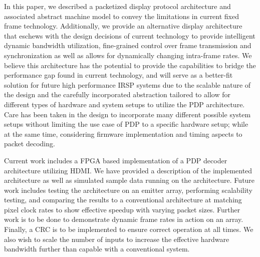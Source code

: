 \label{chap:conclusion}
In this paper, we described a packetized display protocol architecture and associated abstract machine model to convey the limitations in current fixed frame technology. Additionally, we provide an alternative display architecture that eschews with the design decisions of current technology to provide intelligent dynamic bandwidth utilization, fine-grained control over frame transmission and synchronization as well as allows for dynamically changing intra-frame rates. We believe this architecture has the potential to provide the capabilities to bridge the performance gap found in current technology, and will serve as a better-fit solution for future high performance IRSP systems due to the scalable nature of the design and the carefully incorporated abstraction tailored to allow for different types of hardware and system setups to utilize the PDP architecture. Care has been taken in the design to incorporate many different possible system setups without limiting the use case of PDP to a specific hardware setup; while at the same time, considering firmware implementation and timing aspects to packet decoding.

Current work includes a FPGA based implementation of a PDP decoder architecture utilizing HDMI. We have provided a description of the implemented architecture as well as simulated sample data running on the architecture. Future work includes testing the architecture on an emitter array, performing scalability testing, and comparing the results to a conventional architecture at matching pixel clock rates to show effective speedup with varying packet sizes. Further work is to be done to demonstrate dynamic frame rates in action on an array. Finally, a CRC is to be implemented to ensure correct operation at all times. We also wish to scale the number of inputs to increase the effective hardware bandwidth further than capable with a conventional system.
